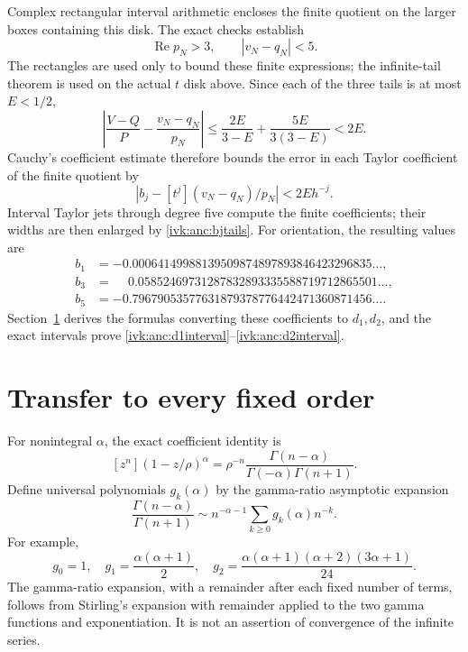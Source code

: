 \documentclass[11pt,letterpaper]{article}
\theoremstyle{remark}\newtheorem{remark}[theorem]{Remark}
\DeclareMathOperator{\Ree}{Re}
\begin{document}
Complex rectangular interval arithmetic encloses the finite
quotient on the larger boxes containing this disk. The exact
checks establish
\begin{equation}\label{ivk:anc:finitequotient}
 \Ree p_N>3,\qquad |v_N-q_N|<5.
\end{equation}
The rectangles are used only to bound these finite expressions;
the infinite-tail theorem is used on the actual $t$ disk above.
Since each of the three tails is at most $E<1/2$,
\[
 \left|\frac{V-Q}{P}-\frac{v_N-q_N}{p_N}\right|
 \le\frac{2E}{3-E}+\frac{5E}{3(3-E)}<2E.
\]
Cauchy's coefficient estimate therefore bounds the error in each
Taylor coefficient of the finite quotient by
\begin{equation}\label{ivk:anc:bjtails}
 |b_j-[t^j](v_N-q_N)/p_N|<2Eh^{-j}.
\end{equation}
Interval Taylor jets through degree five compute the finite
coefficients; their widths are then enlarged by \eqref{ivk:anc:bjtails}.
For orientation, the resulting values are
\begin{align*}
 b_1&=-0.00064149988139509874897893846423296835\ldots,\\
 b_3&=\phantom{-}0.05852469731287832893335588719712865501\ldots,\\
 b_5&=-0.79679053577631879378776442471360871456\ldots.
\end{align*}
Section~\ref{ivk:anc:sec:transfer} derives the formulas converting these
coefficients to $d_1,d_2$, and the exact intervals prove
\eqref{ivk:anc:d1interval}--\eqref{ivk:anc:d2interval}.

\section{Transfer to every fixed order}\label{ivk:anc:sec:transfer}
For nonintegral $\alpha$, the exact coefficient identity is
\begin{equation}\label{ivk:anc:gammaexact}
 [z^n](1-z/\rho)^\alpha
 =\rho^{-n}\frac{\Gamma(n-\alpha)}{\Gamma(-\alpha)\Gamma(n+1)}.
\end{equation}
Define universal polynomials $g_k(\alpha)$ by the gamma-ratio
asymptotic expansion
\begin{equation}\label{ivk:anc:gratio}
 \frac{\Gamma(n-\alpha)}{\Gamma(n+1)}
 \sim n^{-\alpha-1}\sum_{k\ge0}g_k(\alpha)n^{-k}.
\end{equation}
For example,
\[
 g_0=1,\quad g_1=\frac{\alpha(\alpha+1)}2,\quad
 g_2=\frac{\alpha(\alpha+1)(\alpha+2)(3\alpha+1)}{24}.
\]
The gamma-ratio expansion, with a remainder after each fixed
number of terms, follows from Stirling's expansion with remainder
applied to the two gamma functions and exponentiation. It is
not an assertion of convergence of the infinite series.
\end{document}
